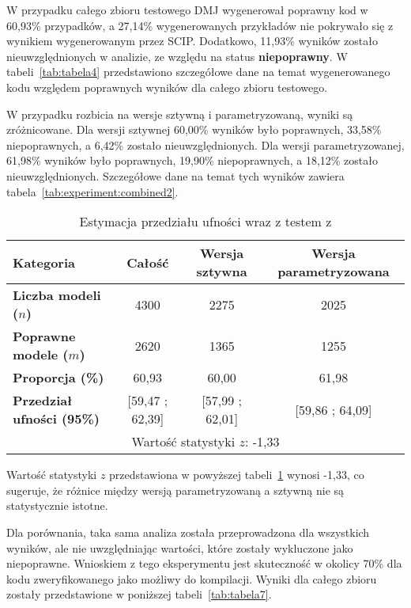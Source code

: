 W przypadku całego zbioru testowego DMJ wygenerował poprawny kod w 60,93\% przypadków, a 27,14\% wygenerowanych przykładów nie pokrywało się z wynikiem wygenerowanym przez SCIP. Dodatkowo, 11,93\% wyników zostało nieuwzględnionych w analizie, ze względu na status \textbf{niepoprawny}. W tabeli~\ref{tab:tabela4} przedstawiono szczegółowe dane na temat wygenerowanego kodu względem poprawnych wyników dla całego zbioru testowego.

W przypadku rozbicia na wersje sztywną i parametryzowaną, wyniki są zróżnicowane. Dla wersji sztywnej 60,00\% wyników było poprawnych, 33,58\% niepoprawnych, a 6,42\% zostało nieuwzględnionych. Dla wersji parametryzowanej, 61,98\% wyników było poprawnych, 19,90\% niepoprawnych, a 18,12\% zostało nieuwzględnionych. Szczegółowe dane na temat tych wyników zawiera tabela~\ref{tab:experiment:combined2}.

\begin{table}[H]
\caption{Estymacja przedziału ufności wraz z testem z}\label{tab:experiment:analysis2}
\centering%
\begin{tabular}{|l|c|c|c|}
\hline
\textbf{Kategoria} & \textbf{Całość} & \textbf{Wersja sztywna} & \textbf{Wersja parametryzowana} \\
\hline
\textbf{Liczba modeli ($n$)} & 4300 & 2275 & 2025 \\
\hline
\textbf{Poprawne modele ($m$)} & 2620 & 1365 & 1255 \\
\hline
\textbf{Proporcja (\%)} & 60,93 & 60,00 & 61,98 \\
\hline
\textbf{Przedział ufności (95\%)} & [59,47 ; 62,39] & [57,99 ; 62,01] & [59,86 ; 64,09] \\
\hline
\multicolumn{4}{|c|}{Wartość statystyki \( z \): -1,33} \\
\hline
\end{tabular}
\end{table}

Wartość statystyki \( z \) przedstawiona w powyższej tabeli~\ref{tab:experiment:analysis2} wynosi -1,33, co sugeruje, że różnice między wersją parametryzowaną a sztywną nie są statystycznie istotne.

Dla porównania, taka sama analiza została przeprowadzona dla wszystkich wyników, ale nie uwzględniając wartości, które zostały wykluczone jako niepoprawne. Wnioskiem z tego eksperymentu jest skuteczność w okolicy 70\% dla kodu zweryfikowanego jako możliwy do kompilacji. Wyniki dla całego zbioru zostały przedstawione w poniższej tabeli~\ref{tab:tabela7}.

